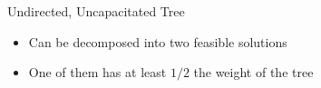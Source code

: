 \begin{frame}{Undirected, Uncapacitated Tree}
\begin{itemize}
  \item Can be decomposed into two feasible solutions
  \item One of them has at least $1/2$ the weight of the tree
\end{itemize}
\centering

\end{frame}